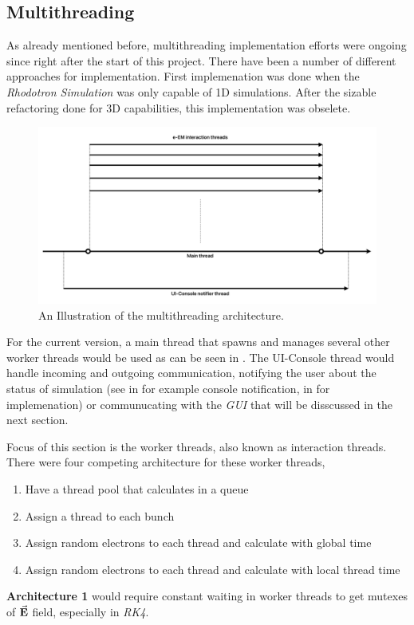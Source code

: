 \documentclass{book}
\begin{document}
\subsection{Multithreading}
As already mentioned before, multithreading implementation efforts were ongoing since right after the start of this project. 
There have been a number of different approaches for implementation. 
First implemenation was done when the \textit{Rhodotron Simulation} was only capable of 1D simulations.
After the sizable refactoring done for 3D capabilities, this implementation was obselete. 
\begin{figure}[H]
    \centering
    \includegraphics[width=\linewidth]{../../../figures/illustrations/multh_arc.png}
    \caption{An Illustration of the multithreading architecture.}
    \label{fig:multh_illustration}
\end{figure}
For the current version, a main thread that spawns and manages several other worker threads would be used as can be seen in .
The UI-Console thread would handle incoming and outgoing communication, notifying the user about the status of simulation 
(see  in  for example console notification,  in  for implemenation)
or communucating with the \textit{GUI} that will be disscussed in the next section.

Focus of this section is the worker threads, also known as \eEM interaction threads.
There were four competing architecture for these worker threads,
\begin{enumerate}
    \item Have a thread pool that calculates \eEM in a queue 
    \item Assign a thread to each bunch
    \item Assign random electrons to each thread and calculate \eEM with global time
    \item Assign random electrons to each thread and calculate \eEM with local thread time
\end{enumerate}
\textbf{Architecture 1} would require constant waiting in worker threads to get mutexes of $\vec{\textbf{E}}$ field, especially in \textit{RK4}.
\end{document}
